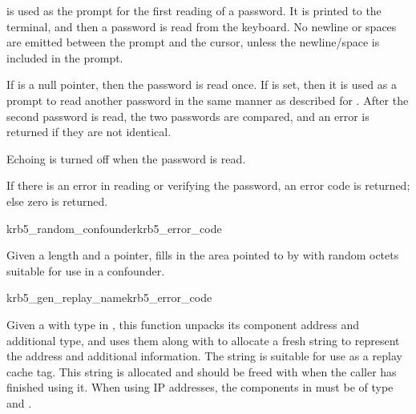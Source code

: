  is used as the prompt for the first reading of a password.
It is printed to the terminal, and then a password is read from the
keyboard.  No newline or spaces are emitted between the prompt and the
cursor, unless the newline/space is included in the prompt.

If  is a null pointer, then the password is read
once.  If  is set, then it is used as a prompt to
read another password in the same manner as described for
.  After the second password is read, the two
passwords are compared, and an error is returned if they are not
identical.

Echoing is turned off when the password is read.

If there is an error in reading or verifying the password, an error code
is returned; else zero is returned.


\begin{funcdecl}{krb5_random_confounder}{krb5_error_code}{\funcin}
\funcout
{}
\end{funcdecl}

Given a length and a pointer, fills in the area pointed to by
 with  random octets suitable for use
in a confounder.

\begin{funcdecl}{krb5_gen_replay_name}{krb5_error_code}{\funcin}
\funcout
{}
\end{funcdecl}

Given a  with type 
in , this function unpacks its component address and
additional type, and uses them along with  to allocate a
fresh string to represent the address and additional information.  The
string is suitable for use as a replay cache tag.  This string is
allocated and should be freed with  when the caller has
finished using it.  When using IP addresses, the components in
 must be of type
 and .

